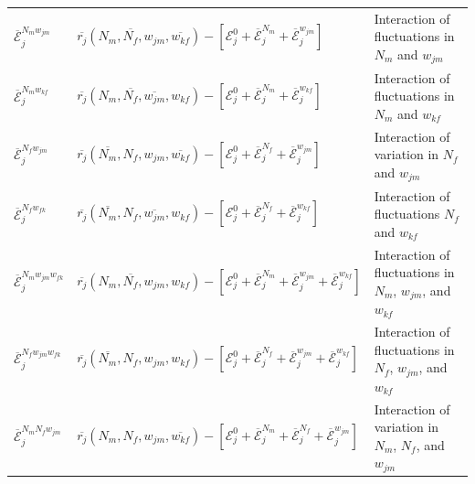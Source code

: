 \documentclass[]{article}
\begin{document}
\begin{table}[h]
{\begin{tabular}{l|l|l}
        $\overline{\mathcal{E}}^{N_{m}w_{jm}}_{j}$ & $\overline{r_{j}}(N_{m}, \overline{N_{f}}, w_{jm}, \overline{w_{kf}})- [\mathcal{E}^{0}_{j} +\overline{\mathcal{E}}^{N_{m}}_j+\overline{\mathcal{E}}^{w_{jm}}_{j}]$  & Interaction of fluctuations in $N_{m}$ and $w_{jm}$ \\


        $\overline{\mathcal{E}}^{N_{m}w_{kf}}_{j}$& $ \overline{r_{j}}(N_{m}, \overline{N_{f}}, \overline{w_{jm}}, w_{kf})- [\mathcal{E}^{0}_{j} +\overline{\mathcal{E}}^{N_{m}}_j+\overline{\mathcal{E}}^{w_{kf}}_{j}]$ & Interaction of fluctuations in $N_{m}$ and $w_{kf}$\\


        $\overline{\mathcal{E}}^{N_{f}w_{jm}}_{j}$& $\overline{r_{j}}(\overline{N_{m}}, N_{f}, w_{jm}, \overline{w_{kf}})- [\mathcal{E}^{0}_{j} +\overline{\mathcal{E}}^{N_{f}}_j+\overline{\mathcal{E}}^{w_{jm}}_{j}]$ & Interaction of variation in $N_{f}$ and $w_{jm}$ \\

        $\overline{\mathcal{E}}^{N_{f}w_{fk}}_{j}$& $ \overline{r_{j}}(\overline{N_{m}}, N_{f}, \overline{w_{jm}}, w_{kf})- [\mathcal{E}^{0}_{j} +\overline{\mathcal{E}}^{N_{f}}_j+\overline{\mathcal{E}}^{w_{kf}}_{j}]$ & Interaction of fluctuations $N_{f}$ and $w_{kf}$ \\


        $\overline{\mathcal{E}}^{N_{m}w_{jm}w_{fk}}_{j}$& $ \overline{r_{j}}(N_{m}, \overline{N_{f}}, w_{jm}, w_{kf})- [\mathcal{E}^{0}_{j} +\overline{\mathcal{E}}^{N_{m}}_{j}+\overline{\mathcal{E}}^{w_{jm}}_j+\overline{\mathcal{E}}^{w_{kf}}_{j}]$  & Interaction of fluctuations in $N_{m}$, $w_{jm}$, and $w_{kf}$ \\

      $\overline{\mathcal{E}}^{N_{f}w_{jm}w_{fk}}_{j}$& $ \overline{r_{j}}(\overline{N_{m}}, N_{f}, w_{jm}, w_{kf})- [\mathcal{E}^{0}_{j} +\overline{\mathcal{E}}^{N_{f}}_{j}+\overline{\mathcal{E}}^{w_{jm}}_j+\overline{\mathcal{E}}^{w_{kf}}_{j}]$ & Interaction of fluctuations in $N_{f}$, $w_{jm}$, and $w_{kf}$ \\

      $\overline{\mathcal{E}}^{N_{m}N_{f}w_{jm}}_{j}$& $ \overline{r_{j}}(N_{m}, N_{f}, w_{jm}, \overline{w_{kf}})- [\mathcal{E}^{0}_{j} +\overline{\mathcal{E}}^{N_{m}}_{j}+\overline{\mathcal{E}}^{N_{f}}_{j}+\overline{\mathcal{E}}^{w_{jm}}_j]$ & Interaction of variation in $N_{m}$, $N_{f}$, and $w_{jm}$ \\




\end{tabular}}
\end{table}
\end{document}
